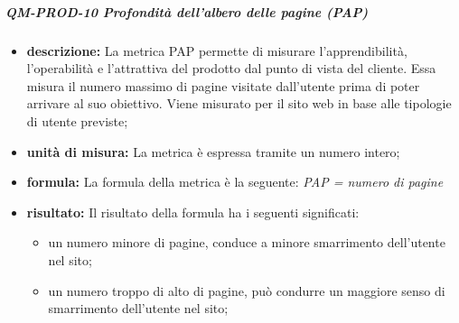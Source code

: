 			\subparagraph{QM-PROD-10 Profondità dell'albero delle pagine (PAP)}
			\begin{itemize}
      			\item \textbf{descrizione: }
					La metrica PAP permette di misurare l'apprendibilità, l'operabilità e l'attrattiva del prodotto dal punto di vista del cliente. Essa misura il numero massimo di pagine visitate dall'utente prima di poter arrivare al suo obiettivo.
					Viene misurato per il sito web in base alle tipologie di utente previste;
				\item \textbf{unità di misura: }
					La metrica è espressa tramite un numero intero;
				\item \textbf{formula: }
					La formula della metrica è la seguente:
					\textit{PAP = numero di pagine}
				\item \textbf{risultato: }
					Il risultato della formula ha i seguenti significati:
					\begin{itemize}
						\item un numero minore di pagine, conduce a minore smarrimento dell'utente nel sito;
						\item un numero troppo di alto di pagine, può condurre un maggiore senso di smarrimento dell'utente nel sito;
					\end{itemize}
			\end{itemize}



